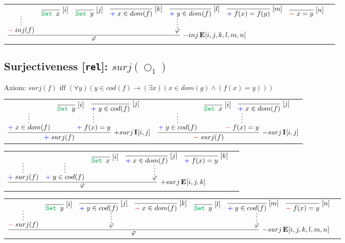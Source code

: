 \documentclass[11pt]{article}
\begin{document}
\noindent
\begin{tabular}{cc}
$
\infer[\DenyRule{inj\,}\Elim{}{[i,j,k,l,m,n]}]{\varphi}{
	\infer*{\Deny{inj(f)}}{}
	&
	\infer*{\varphi}{
        \infer[\Label{i}]{\Set{x}}{} 
		& 
		\infer[\Label{j}]{\Set{y}}{}
		& 
		\infer[\Label{k}]{\Assert{x\in dom(f)}}{}
		& 
		\infer[\Label{l}]{\Assert{y\in dom(f)}}{}
		& 
		\infer[\Label{m}]{\Assert{f(x)= f(y)}}{}
		& 
		\infer[\Label{n}]{\Deny{x= y}}{}
	}
}
$
\end{tabular}
\subsection*{Surjectiveness [\texttt{rel}]:  $surj(\bigcirc_1)$}
\smallskip

\smallskip
\noindent
Axiom: $surj(f)\text{ iff }
(\forall y) (y \in cod(f) \to (\exists x)(x\in dom(g) \land  (f(x)=y)))$
\smallskip
\smallskip

\noindent
\begin{tabular}{cc}
$
\infer[\AssertRule{surj\,}\Intro{}{[i,j]}]{\Assert{surj(f)}}{
	\infer*{\Assert{x\in dom(f)}}{}
	&
	\infer*{\Assert{f(x)= y}}{
        \infer[\Label{i}]{\Set{y}}{} 
		& 
		\infer[\Label{j}]{\Assert{y\in cod(f)}}{}
	}
}
$
&
\hspace{1em}

$
\infer[\DenyRule{surj\,}\Intro{}{[i,j]}]{\Deny{surj(f)}}{
	\infer*{\Assert{y\in cod(f)}}{}
	&
	\infer*{\Deny{f(x)= y}}{
        \infer[\Label{i}]{\Set{x}}{} 
		& 
		\infer[\Label{j}]{\Assert{x\in dom(f)}}{}
	}
}
$
\end{tabular}
\bigskip

\noindent
\begin{tabular}{cc}
$
\infer[\AssertRule{surj\,}\Elim{}{[i,j,k]}]{\varphi}{
	\infer*{\Assert{surj(f)}}{}
	&
	\infer*{\Assert{y\in cod(f)}}{}
	&
	\infer*{\varphi}{
        \infer[\Label{i}]{\Set{x}}{} 
		& 
		\infer[\Label{j}]{\Assert{x\in dom(f)}}{}
		& 
		\infer[\Label{k}]{\Assert{f(x)= y}}{}
	}
}
$
\end{tabular}


\bigskip

\noindent
\begin{tabular}{cc}
$
\infer[\DenyRule{surj\,}\Elim{}{[i,j,k,l,m,n]}]{\varphi}{
	\infer*{\Deny{surj(f)}}{}
	&
	\infer*{\varphi}{
        \infer[\Label{i}]{\Set{y}}{} 
		& 
		\infer[\Label{j}]{\Assert{y\in cod(f)}}{}
		& 
		\infer[\Label{k}]{\Deny{x\in dom(f)}}{}
	}
	&
	\infer*{\varphi}{
        \infer[\Label{l}]{\Set{y}}{} 
		& 
		\infer[\Label{m}]{\Assert{y\in cod(f)}}{}
		& 
		\infer[\Label{n}]{\Deny{f(x)= y}}{}
	}
}
$
\end{tabular}
\end{document}
